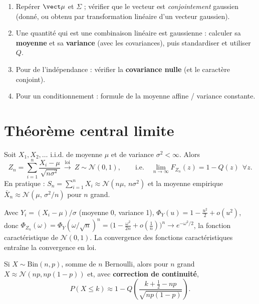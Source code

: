 \documentclass[11pt,a4paper,openany]{book}
\begin{document}
\begin{keybox}[title={Méthode type face à un exercice}]
\begin{enumerate}
\item Repérer $\vect\mu$ et $\Sigma$ ; vérifier que le vecteur est \emph{conjointement}
  gaussien (donné, ou obtenu par transformation linéaire d'un vecteur gaussien).
\item Une quantité qui est une combinaison linéaire est gaussienne : calculer sa
  \textbf{moyenne} et sa \textbf{variance} (avec les covariances), puis standardiser et
  utiliser $Q$.
\item Pour de l'indépendance : vérifier la \textbf{covariance nulle} (et le caractère conjoint).
\item Pour un conditionnement : formule de la moyenne affine / variance constante.
\end{enumerate}
\end{keybox}

\section{Théorème central limite}

\begin{thmbox}[title={Théorème central limite}]
Soit $X_1,X_2,\dots$ i.i.d. de moyenne $\mu$ et de variance $\sigma^2<\infty$. Alors
\[
Z_n = \sum_{i=1}^n\frac{X_i-\mu}{\sqrt{n\sigma^2}}
\ \xrightarrow{\text{loi}}\ Z\sim\mathcal{N}(0,1),
\qquad\text{i.e.}\quad \lim_{n\to\infty}F_{Z_n}(z) = 1 - Q(z) \ \ \forall z.
\]
En pratique : $S_n = \sum_{i=1}^n X_i \approx \mathcal{N}(n\mu,\,n\sigma^2)$ et la moyenne
empirique $\bar X_n \approx \mathcal{N}(\mu,\,\sigma^2/n)$ pour $n$ grand.
\end{thmbox}

\begin{proofbox}[title={Idée de la preuve}]
Avec $Y_i = (X_i-\mu)/\sigma$ (moyenne 0, variance 1), $\Phi_{Y}(u) = 1 - \frac{u^2}{2} +
o(u^2)$, donc $\Phi_{Z_n}(\omega) = \Phi_Y(\omega/\sqrt n)^n = \big(1 - \frac{\omega^2}{2n} +
o(\frac1n)\big)^n \to e^{-\omega^2/2}$, la fonction caractéristique de $\mathcal{N}(0,1)$.
La convergence des fonctions caractéristiques entraîne la convergence en loi.
\end{proofbox}

\begin{propbox}[title={Approximation d'une binomiale}]
Si $X\sim\text{Bin}(n,p)$, somme de $n$ Bernoulli, alors pour $n$ grand $X\approx
\mathcal{N}(np,np(1-p))$ et, avec \textbf{correction de continuité},
\[
P(X\leq k) \approx 1 - Q\!\left(\frac{k+\frac12-np}{\sqrt{np(1-p)}}\right).
\]
\end{propbox}
\end{document}
